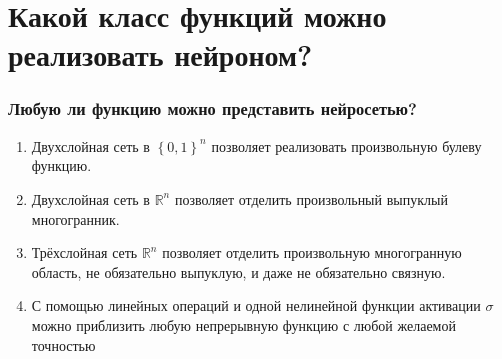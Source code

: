 \documentclass[10pt]{beamer}
\begin{document}
\section{Какой класс функций можно реализовать нейроном?}

\begin{frame}\frametitle{Любую ли функцию можно представить нейросетью?}
	\begin{enumerate}[--]
		\item Двухслойная сеть в $\left\{0, 1 \right\}^n$ позволяет реализовать произвольную булеву функцию.
		\item Двухслойная сеть в $\mathbb{R}^n$ позволяет отделить произвольный выпуклый многогранник.
		\item Трёхслойная сеть $\mathbb{R}^n$ позволяет отделить произвольную многогранную область, не обязательно выпуклую, и даже не обязательно связную.
		\item С помощью линейных операций и одной нелинейной функции активации $\sigma$ можно приблизить любую непрерывную функцию с любой желаемой точностью
	\end{enumerate}
\end{frame}
\end{document}

